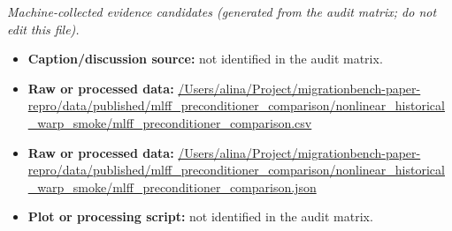 \emph{Machine-collected evidence candidates (generated from the audit matrix; do not edit this file).}
\begin{itemize}[leftmargin=1.4em,noitemsep]
\item \textbf{Caption/discussion source:} not identified in the audit matrix.
\item \textbf{Raw or processed data:} \url{/Users/alina/Project/migrationbench-paper-repro/data/published/mlff_preconditioner_comparison/nonlinear_historical_warp_smoke/mlff_preconditioner_comparison.csv}
\item \textbf{Raw or processed data:} \url{/Users/alina/Project/migrationbench-paper-repro/data/published/mlff_preconditioner_comparison/nonlinear_historical_warp_smoke/mlff_preconditioner_comparison.json}
\item \textbf{Plot or processing script:} not identified in the audit matrix.
\end{itemize}
